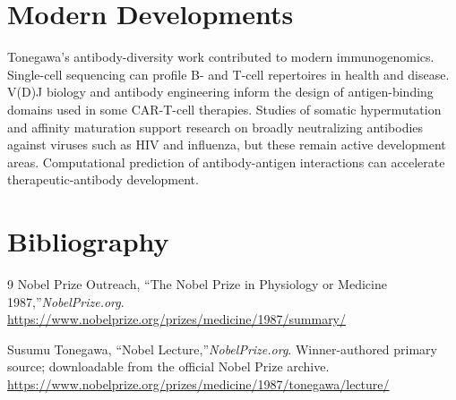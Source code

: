 \section{Modern Developments}

Tonegawa's antibody-diversity work contributed to modern immunogenomics. Single-cell sequencing can profile B- and T-cell repertoires in health and disease. V(D)J biology and antibody engineering inform the design of antigen-binding domains used in some CAR-T-cell therapies. Studies of somatic hypermutation and affinity maturation support research on broadly neutralizing antibodies against viruses such as HIV and influenza, but these remain active development areas. Computational prediction of antibody-antigen interactions can accelerate therapeutic-antibody development.


\section{Bibliography}

\begin{thebibliography}{9}
Nobel Prize Outreach, ``The Nobel Prize in Physiology or Medicine 1987,''\emph{NobelPrize.org}.\\
\url{https://www.nobelprize.org/prizes/medicine/1987/summary/}

Susumu Tonegawa, ``Nobel Lecture,''\emph{NobelPrize.org}. Winner-authored primary source; downloadable from the official Nobel Prize archive.\\
\url{https://www.nobelprize.org/prizes/medicine/1987/tonegawa/lecture/}
\end{thebibliography}
